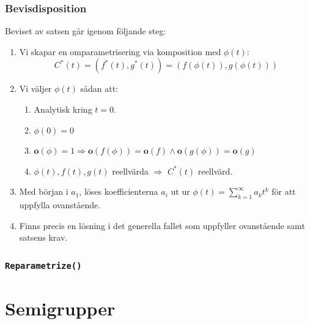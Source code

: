 \documentclass{beamer}
\begin{document}
\begin{frame}
	\frametitle{Bevisdisposition}
	Beviset av satsen går igenom följande steg:
	
	\begin{enumerate}
		\item<1-> Vi skapar en omparametrisering via komposition med $\phi(t)$:
		\[C^*(t) = (f^*(t), g^*(t)) = (f(\phi(t)), g(\phi(t)))\]
		
		\item<2-> Vi väljer $\phi(t)$ sådan att:
		\begin{enumerate}
			\item<3-> Analytisk kring $t = 0$.
			
			\item<4-> $\phi(0)=0$
			
			\item<5-> $\mathbf{o}(\phi)=1 \Longrightarrow \mathbf{o}(f(\phi))=\mathbf{o}(f) \wedge \mathbf{o}(g(\phi))=\mathbf{o}(g)$
			
			\item<6-> $\phi(t), f(t), g(t)$ reellvärda $\Longrightarrow$ $C^*(t)$ reellvärd.
			
		\end{enumerate}
		
		\item<7-> Med början i $a_1$, löses koefficienterna $a_i$ ut ur $\phi(t)=\sum_{k=1}^{\infty}a_k t^k$ för att uppfylla ovanstående.
		
		\item<8-> Finns precis en lösning i det generella fallet som uppfyller ovanstående samt satsens krav.
		
	\end{enumerate}
\end{frame}

\begin{frame}
	\frametitle{\texttt{Reparametrize()}}
\end{frame}

\begin{frame}
	\frametitle{}
\end{frame}

\begin{frame}
	\frametitle{}
\end{frame}

\begin{frame}
	\frametitle{}
\end{frame}


\section{Semigrupper}
\end{document}
